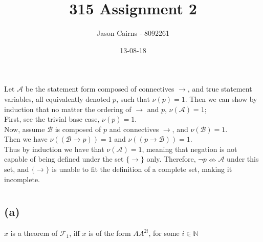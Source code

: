 \documentclass[11pt,oneside,a4paper]{article}
\begin{document}
\title{315 Assignment 2}
\author{Jason Cairns - 8092261}
\date{13-08-18}
\maketitle

\section{}
Let $\mathcal{A}$ be the statement form composed of connectives $\to$, and true statement variables, all equivalently denoted $p$, such that $\nu (p)=1$. Then we can show by induction that no matter the ordering of $\to$ and $p$, $\nu (\mathcal{A} ) = 1$;\\
First, see the trivial base case, $\nu (p)=1$.\\
Now, assume $\mathcal{B} $ is composed of $p$ and connectives $\to $, and $\nu ( \mathcal{B} ) =1$.\\
Then we have $\nu ((\mathcal{B} \to p )) = 1$ and $\nu ((p \to \mathcal{B})) = 1$.\\
Thus by induction we have that $\nu (\mathcal{A})=1$, meaning that negation is not capable of being defined under the set $\{ \to \}$ only. Therefore, $\neg p 
\nLeftrightarrow \mathcal{A}$ under this set, and $\{ \to \}$ is unable to fit the definition of a complete set, making it incomplete.

\section{}
\subsection*{(a)}
$x$ is a theorem of $\mathcal{F}_1$, iff $x$ is of the form $AA^{2i}$, for some $i \in \mathbb{N}$
\end{document}
